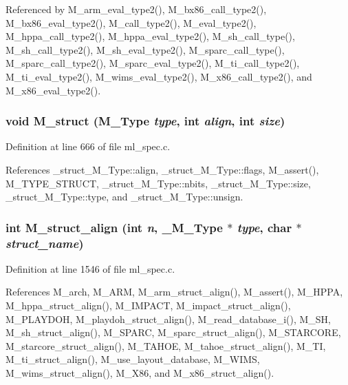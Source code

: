 Referenced by M\_\-arm\_\-eval\_\-type2(), M\_\-bx86\_\-call\_\-type2(), M\_\-bx86\_\-eval\_\-type2(), M\_\-call\_\-type2(), M\_\-eval\_\-type2(), M\_\-hppa\_\-call\_\-type2(), M\_\-hppa\_\-eval\_\-type2(), M\_\-sh\_\-call\_\-type(), M\_\-sh\_\-call\_\-type2(), M\_\-sh\_\-eval\_\-type2(), M\_\-sparc\_\-call\_\-type(), M\_\-sparc\_\-call\_\-type2(), M\_\-sparc\_\-eval\_\-type2(), M\_\-ti\_\-call\_\-type2(), M\_\-ti\_\-eval\_\-type2(), M\_\-wims\_\-eval\_\-type2(), M\_\-x86\_\-call\_\-type2(), and M\_\-x86\_\-eval\_\-type2().
\subsubsection{\setlength{\rightskip}{0pt plus 5cm}void M\_\-struct (\bf{M\_\-Type} {\em type}, int {\em align}, int {\em size})}\label{m__spec_8h_4eda1edc2e5bec85c084018921cb198d}




Definition at line 666 of file ml\_\-spec.c.

References \_\-struct\_\-M\_\-Type::align, \_\-struct\_\-M\_\-Type::flags, M\_\-assert(), M\_\-TYPE\_\-STRUCT, \_\-struct\_\-M\_\-Type::nbits, \_\-struct\_\-M\_\-Type::size, \_\-struct\_\-M\_\-Type::type, and \_\-struct\_\-M\_\-Type::unsign.
\subsubsection{\setlength{\rightskip}{0pt plus 5cm}int M\_\-struct\_\-align (int {\em n}, \bf{\_\-M\_\-Type} $\ast$ {\em type}, char $\ast$ {\em struct\_\-name})}\label{m__spec_8h_a2ee4c74410638b0628ecf3d8ee42eb8}




Definition at line 1546 of file ml\_\-spec.c.

References M\_\-arch, M\_\-ARM, M\_\-arm\_\-struct\_\-align(), M\_\-assert(), M\_\-HPPA, M\_\-hppa\_\-struct\_\-align(), M\_\-IMPACT, M\_\-impact\_\-struct\_\-align(), M\_\-PLAYDOH, M\_\-playdoh\_\-struct\_\-align(), M\_\-read\_\-database\_\-i(), M\_\-SH, M\_\-sh\_\-struct\_\-align(), M\_\-SPARC, M\_\-sparc\_\-struct\_\-align(), M\_\-STARCORE, M\_\-starcore\_\-struct\_\-align(), M\_\-TAHOE, M\_\-tahoe\_\-struct\_\-align(), M\_\-TI, M\_\-ti\_\-struct\_\-align(), M\_\-use\_\-layout\_\-database, M\_\-WIMS, M\_\-wims\_\-struct\_\-align(), M\_\-X86, and M\_\-x86\_\-struct\_\-align().
